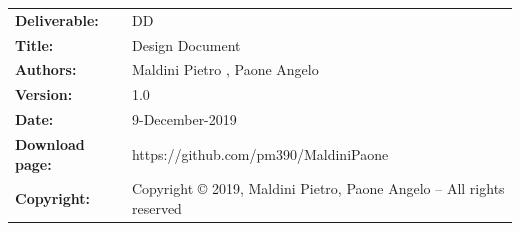 \begin{table}[h!]
\begin{tabu} to \textwidth { X[0.3,r,p] X[0.7,l,p] }
\hline

\textbf{Deliverable:} & DD\\
\textbf{Title:} & Design Document \\
\textbf{Authors:} & Maldini Pietro , Paone Angelo \\
\textbf{Version:} & 1.0 \\ 
\textbf{Date:} & 9-December-2019 \\
\textbf{Download page:} & https://github.com/pm390/MaldiniPaone\\
\textbf{Copyright:} & Copyright © 2019, Maldini Pietro, Paone Angelo – All rights reserved \\
\hline
\end{tabu}
\end{table}




\setcounter{page}{2}


\newpage
{}
\tableofcontents


\clearpage
{}
\label{sect:introduction}


\clearpage
{}
\label{sect:archituctural design}


\clearpage
{}
\label{sect:user interface design}


